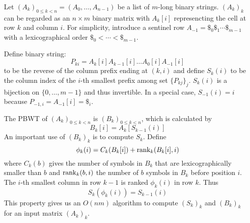 \documentclass{article}[10pt]
\begin{document}
Let $(A_k)_{0\le k<n}=(A_0,\ldots,A_{n-1})$ be a list of $m$-long binary
strings. $(A_k)_k$ can be regarded as an $n\times m$ binary matrix with
$A_k[i]$ represencting the cell at row $k$ and column $i$.  For simplicity,
introduce a sentinel row $A_{-1}=\$_0\$_1\cdots\$_{m-1}$ with a lexicographical
order $\$_0<\cdots<\$_{m-1}$.

Define binary string:
\[
P_{ki}=A_k[i]A_{k-1}[i]\ldots A_0[i]A_{-1}[i]
\]
to be the reverse of the column prefix ending at $(k,i)$ and define $S_k(i)$ to
be the column index of the $i$-th smallest prefix among set $\{P_{kj}\}_j$.
$S_k(i)$ is a bijection on $\{0,\ldots,m-1\}$ and thus invertible. In a
special case, $S_{-1}(i)=i$ because $P_{-1,i}=A_{-1}[i]=\$_i$.

The PBWT of $(A_k)_{0\le k<n}$ is $(B_k)_{0\le k<n}$, which is
calculated by
\begin{equation}\label{eq:B}
B_k[i]=A_k[S_{k-1}(i)]
\end{equation}
An important use of $(B_k)_k$ is to compute $S_k$. Define
\begin{equation}\label{eq:phi}
\phi_k(i)=C_k(B_k[i])+{\rm rank}_k(B_k[i],i)
\end{equation}
where $C_k(b)$ gives the number of symbols in $B_k$ that are lexicographically
smaller than $b$ and ${\rm rank}_k(b,i)$ the number of $b$ symbols in $B_k$
before position $i$. The $i$-th smallest column in row $k-1$ is ranked
$\phi_k(i)$ in row $k$. Thus
\begin{equation}\label{eq:trans}
S_k(\phi_k(i))=S_{k-1}(i)
\end{equation}
This property gives us an $O(nm)$ algorithm to compute $(S_k)_k$ and $(B_k)_k$
for an input matrix $(A_k)_k$.
\end{document}
